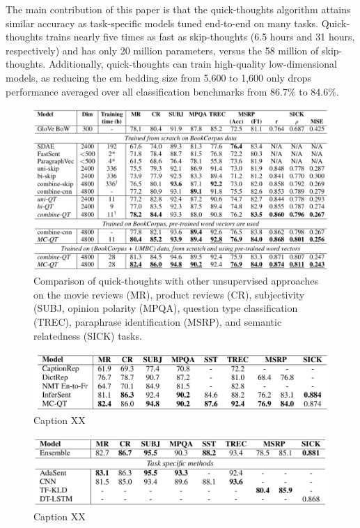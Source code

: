 The main contribution of this paper is that the quick-thoughts algorithm attains similar accuracy as task-specific models tuned end-to-end on many tasks. Quick-thoughts trains nearly five times as fast as skip-thoughts (6.5 hours and 31 hours, respectively) and has only 20 million parameters, versus the 58 million of skip-thoughts. Additionally, quick-thoughts can train high-quality low-dimensional models, as reducing the em bedding size from 5,600 to 1,600 only drops performance averaged over all classification benchmarks from 86.7\% to 84.6\%. 

\newpage

\begin{figure}[h!]
\centering
  \includegraphics[width=1\linewidth]{files/quickthoughts-2.png}
  \caption{Comparison of quick-thoughts with other unsupervised approaches on the movie reviews (MR), product reviews (CR), subjectivity (SUBJ, opinion polarity (MPQA), question type classification (TREC), paraphrase identification (MSRP), and semantic relatedness (SICK) tasks.}
  \label{fig:quickthoughts-res1}
\end{figure}

\begin{figure}[h!]
\centering
  \includegraphics[width=1\linewidth]{files/quickthoughts-3.png}
  \caption{Caption XX}
  \label{fig:quickthoughts-res2}
\end{figure}

\begin{figure}[h!]
\centering
  \includegraphics[width=1\linewidth]{files/quickthoughts-4.png}
  \caption{Caption XX}
  \label{fig:quickthoughts-res3}
\end{figure}

